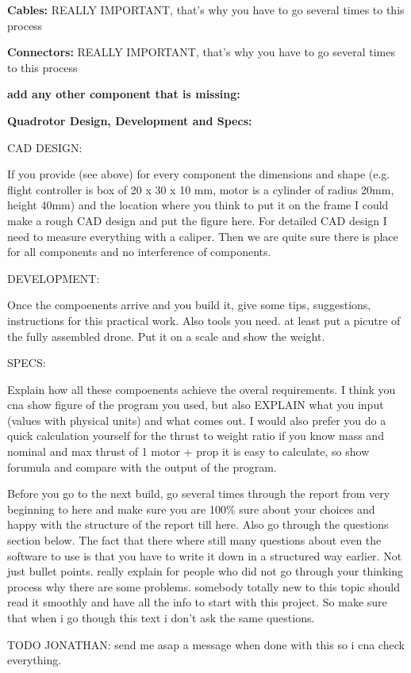 \textbf{Cables:} REALLY IMPORTANT, that's why you have to go several times to this process 

\textbf{Connectors:} REALLY IMPORTANT, that's why you have to go several times to this process

\textbf{add any other component that is missing:} 


\textbf{Quadrotor Design, Development and Specs:}

CAD DESIGN:

If you provide (see above) for every component the dimensions and shape (e.g. flight controller is box of 20 x 30 x 10 mm, motor is a cylinder of radius 20mm, height 40mm) and the location where you think to put it on the frame I could make a rough CAD design and put the figure here. For detailed CAD design I need to measure everything with a caliper. Then we are quite sure there is place for all components and no interference of components.


DEVELOPMENT:

Once the compoenents arrive and you build it, give some tips, suggestions, instructions for this practical work. Also tools you need. at least put a picutre of the fully assembled drone. Put it on a scale and show the weight.

SPECS:

Explain how all these compoenents achieve the overal requirements. I think you cna show figure of the program you used, but also EXPLAIN what you input (values with physical units) and what comes out. I would also prefer you do a quick calculation yourself for the thrust to weight ratio if you know mass and nominal and max thrust of 1 motor + prop it is easy to calculate, so show forumula and compare with the output of the program. 


Before you go to the next build, go several times through the report from very beginning to here and make sure you are 100\% sure about your choices and happy with the structure of the report till here. Also go through the questions section below. The fact that there where still many questions about even the software to use is that you have to write it down in a structured way earlier. Not just bullet points. really explain for people who did not go through your thinking process why there are some problems. somebody totally new to this topic should read it smoothly and have all the info to start with this project. So make sure that when i go though this text i don't ask the same questions.

{\color{red}TODO JONATHAN: send me asap a message when done with this so i cna check everything. \\}

